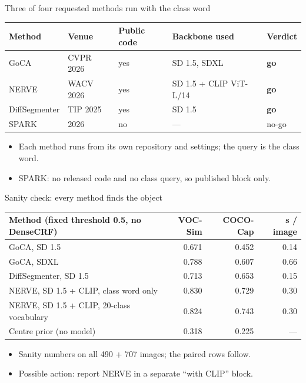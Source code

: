 
\begin{frame}{Three of four requested methods run with the class word}
\begin{slidetable}
\begin{tabular}{@{}lllll@{}}
\toprule
Method & Venue & Public code & Backbone used & Verdict \\
\midrule
GoCA & CVPR 2026 & yes & SD 1.5, SDXL & \textbf{go} \\
NERVE & WACV 2026 & yes & SD 1.5 + CLIP ViT-L/14 & \textbf{go} \\
DiffSegmenter & TIP 2025 & yes & SD 1.5 & \textbf{go} \\
SPARK & 2026 & no & --- & no-go \\
\bottomrule
\end{tabular}
\end{slidetable}
\begin{itemize}
\item Each method runs from its own repository and settings; the query is the class word.
\item SPARK: no released code and no class query, so published block only.
\end{itemize}
\end{frame}

\begin{frame}{Sanity check: every method finds the object}
\begin{slidetable}
\begin{tabular}{@{}lrrr@{}}
\toprule
Method (fixed threshold 0.5, no DenseCRF) & VOC-Sim & COCO-Cap & s / image \\
\midrule
GoCA, SD 1.5 & 0.671 & 0.452 & 0.14 \\
GoCA, SDXL & 0.788 & 0.607 & 0.66 \\
DiffSegmenter, SD 1.5 & 0.713 & 0.653 & 0.15 \\
NERVE, SD 1.5 + CLIP, class word only & 0.830 & 0.729 & 0.30 \\
NERVE, SD 1.5 + CLIP, 20-class vocabulary & 0.824 & 0.743 & 0.30 \\
Centre prior (no model) & 0.318 & 0.225 & --- \\
\bottomrule
\end{tabular}
\end{slidetable}
\begin{itemize}
\item Sanity numbers on all 490 + 707 images; the paired rows follow.
\item Possible action: report NERVE in a separate ``with CLIP'' block.
\end{itemize}
\end{frame}

